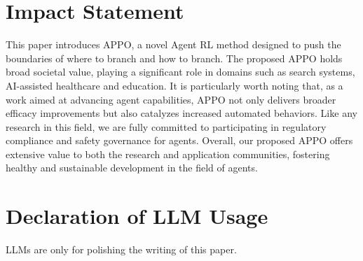 \documentclass{article}
\begin{document}
\section{Impact Statement}\label{appx:j}
This paper introduces APPO, a novel Agent RL method designed to push the boundaries of where to branch and how to branch. The proposed APPO holds broad societal value, playing a significant role in domains such as search systems, AI-assisted healthcare and education. It is particularly worth noting that, as a work aimed at advancing agent capabilities, APPO not only delivers broader efficacy improvements but also catalyzes increased automated behaviors. Like any research in this field, we are fully committed to participating in regulatory compliance and safety governance for agents. Overall, our proposed APPO offers extensive value to both the research and application communities, fostering healthy and sustainable development in the field of agents.

\section{Declaration of LLM Usage}\label{appx:k}
LLMs are only for polishing the writing of this paper.
 
 
\end{document}
